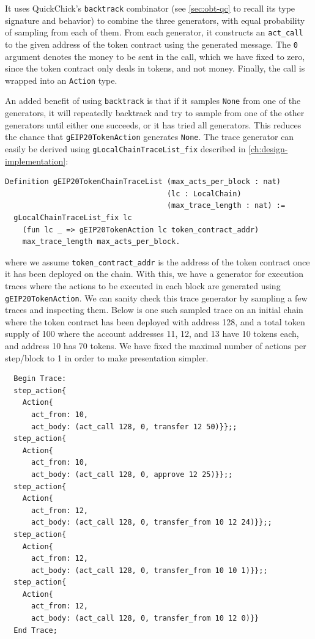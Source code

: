 \documentclass[twoside,11pt,openright]{report}
\newenvironment{code}{\captionsetup{type=figure, singlelinecheck=off, justification=raggedleft}}{}
\newcommand{\coq}[1]{\texttt{#1}}
\begin{document}
It uses QuickChick's \coq{backtrack} combinator (see \autoref{sec:obt-qc} to recall its type signature and behavior) to combine the three generators, with equal probability of sampling from each of them. From each generator, it constructs an \coq{act\_call} to the given address of the token contract using the generated message. The \coq{0} argument denotes the money to be sent in the call, which we have fixed to zero, since the token contract only deals in tokens, and not money. Finally, the call is wrapped into an \coq{Action} type.

An added benefit of using \coq{backtrack} is that if it samples \coq{None} from one of the generators, it will repeatedly backtrack and try to sample from one of the other generators until either one succeeds, or it has tried all generators. This reduces the chance that \coq{gEIP20TokenAction} generates \coq{None}. The trace generator can easily be derived using \coq{gLocalChainTraceList\_fix} described in \autoref{ch:design-implementation}:
\begin{code}
\label{def:gEIP20TokenChainTraceList}
\begin{verbatim}
Definition gEIP20TokenChainTraceList (max_acts_per_block : nat)
                                     (lc : LocalChain)
                                     (max_trace_length : nat) := 
  gLocalChainTraceList_fix lc 
    (fun lc _ => gEIP20TokenAction lc token_contract_addr) 
    max_trace_length max_acts_per_block.
\end{verbatim}
\end{code}
where we assume \coq{token\_contract\_addr} is the address of the token contract once it has been deployed on the chain. With this, we have a generator for execution traces where the actions to be executed in each block are generated using \coq{gEIP20TokenAction}. We can sanity check this trace generator by sampling a few traces and inspecting them. Below is one such sampled trace on an initial chain where the token contract has been deployed with address 128, and a total token supply of 100 where the account addresses 11, 12, and 13 have 10 tokens each, and address 10 has 70 tokens. We have fixed the maximal number of actions per step/block to 1 in order to make presentation simpler.
\begin{code}
\begin{verbatim}
  Begin Trace: 
  step_action{
    Action{
      act_from: 10, 
      act_body: (act_call 128, 0, transfer 12 50)}};;
  step_action{
    Action{
      act_from: 10, 
      act_body: (act_call 128, 0, approve 12 25)}};;
  step_action{
    Action{
      act_from: 12, 
      act_body: (act_call 128, 0, transfer_from 10 12 24)}};;
  step_action{
    Action{
      act_from: 12, 
      act_body: (act_call 128, 0, transfer_from 10 10 1)}};;
  step_action{
    Action{
      act_from: 12, 
      act_body: (act_call 128, 0, transfer_from 10 12 0)}}
  End Trace; 
\end{verbatim}
\end{code}
\end{document}
